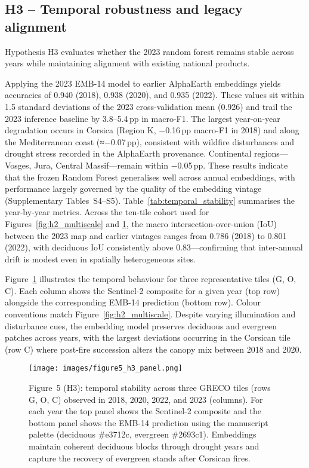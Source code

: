 \documentclass[utf8]{FrontiersinHarvard}
\begin{document}
\subsection{H3 -- Temporal robustness and legacy alignment}
Hypothesis H3 evaluates whether the 2023 random forest remains stable across years while maintaining alignment with existing national products.

Applying the 2023 EMB-14 model to earlier AlphaEarth embeddings yields accuracies of 0.940 (2018), 0.938 (2020), and 0.935 (2022). These values sit within 1.5 standard deviations of the 2023 cross-validation mean (0.926) and trail the 2023 inference baseline by 3.8–5.4\,pp in macro-F1. The largest year-on-year degradation occurs in Corsica (Region K, −0.16\,pp macro-F1 in 2018) and along the Mediterranean coast (≈−0.07\,pp), consistent with wildfire disturbances and drought stress recorded in the AlphaEarth provenance. Continental regions—Vosges, Jura, Central Massif—remain within −0.05\,pp. These results indicate that the frozen Random Forest generalises well across annual embeddings, with performance largely governed by the quality of the embedding vintage (Supplementary Tables~S4–S5). Table~\ref{tab:temporal_stability} summarises the year-by-year metrics. Across the ten-tile cohort used for Figures~\ref{fig:h2_multiscale} and \ref{fig:h3_temporal}, the macro intersection-over-union (IoU) between the 2023 map and earlier vintages ranges from 0.786 (2018) to 0.801 (2022), with deciduous IoU consistently above 0.83—confirming that inter-annual drift is modest even in spatially heterogeneous sites.

Figure~\ref{fig:h3_temporal} illustrates the temporal behaviour for three representative tiles (G, O, C). Each column shows the Sentinel-2 composite for a given year (top row) alongside the corresponding EMB-14 prediction (bottom row). Colour conventions match Figure~\ref{fig:h2_multiscale}. Despite varying illumination and disturbance cues, the embedding model preserves deciduous and evergreen patches across years, with the largest deviations occurring in the Corsican tile (row C) where post-fire succession alters the canopy mix between 2018 and 2020.

\begin{figure}[H]
    \centering
    \texttt{[image: images/figure5\_h3\_panel.png]}
    \caption{Figure~5 (H3): temporal stability across three GRECO tiles (rows G, O, C) observed in 2018, 2020, 2022, and 2023 (columns). For each year the top panel shows the Sentinel-2 composite and the bottom panel shows the EMB-14 prediction using the manuscript palette (deciduous \#e3712c, evergreen \#2693c1). Embeddings maintain coherent deciduous blocks through drought years and capture the recovery of evergreen stands after Corsican fires.}
    \label{fig:h3_temporal}
\end{figure}
\end{document}
